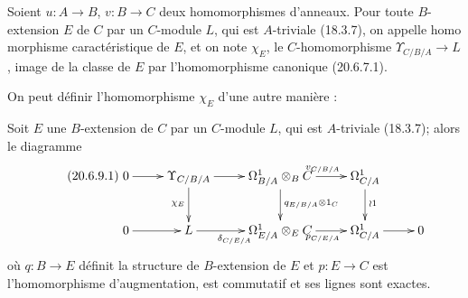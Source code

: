 \begin{definition}[20.6.8]
\label{0.20.6.8-fr}
Soient $u:A\to B$, $v:B\to C$ deux homomorphismes d'anneaux. Pour toute
$B$-extension $E$ de $C$ par un $C$-module $L$, qui est $A$-triviale
\textup{(18.3.7)}, on appelle homo%
morphisme caractéristique de $E$, et on
note $\chi_E$, le $C$-homomorphisme $\Upsilon_{C/B/A}\to L$, image de la
classe de $E$ par l'homomorphisme canonique \textup{(20.6.7.1)}.
\end{definition}

On peut définir l'homomorphisme $\chi_E$ d'une autre manière :
\begin{proposition}[20.6.9]
\label{0.20.6.9-fr}
Soit $E$ une $B$-extension de $C$ par un $C$-module $L$, qui est
$A$-triviale \textup{(18.3.7)}; alors le diagramme
\begin{equation}
\tag{20.6.9.1}
\label{0.20.6.9.1-fr}
\xymatrix{
  0 \ar[r] & \Upsilon_{C/B/A} \ar[r] \ar[d]_{\chi_E} &
  \Omega^1_{B/A}\otimes_B C \ar[r]^{v_{C/B/A}}
    \ar[d]^{q_{E/B/A}\otimes1_C} &
  \Omega^1_{C/A} \ar[d]^{\wr 1} \\
  0 \ar[r] & L \ar[r]_{\delta_{C/E/A}} &
  \Omega^1_{E/A}\otimes_E C \ar[r]_{p_{C/E/A}} &
  \Omega^1_{C/A} \ar[r] & 0
}
\end{equation}
où $q:B\to E$ définit la structure de $B$-extension de $E$ et
$p:E\to C$ est l'homomorphisme d'augmentation, est commutatif et ses
lignes sont exactes.
\end{proposition}

